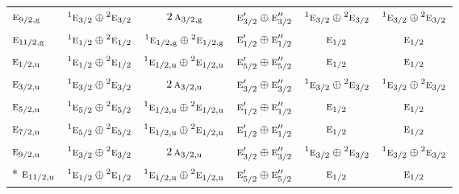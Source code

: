 \documentclass[10pt,a4paper]{article}
\numberwithin{equation}{section}
\newcommand{\irr}[1]{\text{\normalfont\scshape #1}}
\newcommand{\conjpair}[1]{{}^{#1}}
\newcommand{\ptag}[1]{\mathrm{#1}}
\begin{document}
{\begin{longtable}{@{}lccccc@{}}
$\irr{e}_{9/2,\ptag{g}}$ & $\conjpair{1}\irr{e}_{3/2}\oplus \conjpair{2}\irr{e}_{3/2}$ & $2\,\irr{a}_{3/2,\ptag{g}}$ & $\irr{e}_{3/2}'\oplus \irr{e}_{3/2}''$ & $\conjpair{1}\irr{e}_{3/2}\oplus \conjpair{2}\irr{e}_{3/2}$ & $\conjpair{1}\irr{e}_{3/2}\oplus \conjpair{2}\irr{e}_{3/2}$\\
$\irr{e}_{11/2,\ptag{g}}$ & $\conjpair{1}\irr{e}_{1/2}\oplus \conjpair{2}\irr{e}_{1/2}$ & $\conjpair{1}\irr{e}_{1/2,\ptag{g}}\oplus \conjpair{2}\irr{e}_{1/2,\ptag{g}}$ & $\irr{e}_{1/2}'\oplus \irr{e}_{1/2}''$ & $\irr{e}_{1/2}$ & $\irr{e}_{1/2}$\\
$\irr{e}_{1/2,\ptag{u}}$ & $\conjpair{1}\irr{e}_{1/2}\oplus \conjpair{2}\irr{e}_{1/2}$ & $\conjpair{1}\irr{e}_{1/2,\ptag{u}}\oplus \conjpair{2}\irr{e}_{1/2,\ptag{u}}$ & $\irr{e}_{5/2}'\oplus \irr{e}_{5/2}''$ & $\irr{e}_{1/2}$ & $\irr{e}_{1/2}$\\
$\irr{e}_{3/2,\ptag{u}}$ & $\conjpair{1}\irr{e}_{3/2}\oplus \conjpair{2}\irr{e}_{3/2}$ & $2\,\irr{a}_{3/2,\ptag{u}}$ & $\irr{e}_{3/2}'\oplus \irr{e}_{3/2}''$ & $\conjpair{1}\irr{e}_{3/2}\oplus \conjpair{2}\irr{e}_{3/2}$ & $\conjpair{1}\irr{e}_{3/2}\oplus \conjpair{2}\irr{e}_{3/2}$\\
$\irr{e}_{5/2,\ptag{u}}$ & $\conjpair{1}\irr{e}_{5/2}\oplus \conjpair{2}\irr{e}_{5/2}$ & $\conjpair{1}\irr{e}_{1/2,\ptag{u}}\oplus \conjpair{2}\irr{e}_{1/2,\ptag{u}}$ & $\irr{e}_{1/2}'\oplus \irr{e}_{1/2}''$ & $\irr{e}_{1/2}$ & $\irr{e}_{1/2}$\\
$\irr{e}_{7/2,\ptag{u}}$ & $\conjpair{1}\irr{e}_{5/2}\oplus \conjpair{2}\irr{e}_{5/2}$ & $\conjpair{1}\irr{e}_{1/2,\ptag{u}}\oplus \conjpair{2}\irr{e}_{1/2,\ptag{u}}$ & $\irr{e}_{1/2}'\oplus \irr{e}_{1/2}''$ & $\irr{e}_{1/2}$ & $\irr{e}_{1/2}$\\
$\irr{e}_{9/2,\ptag{u}}$ & $\conjpair{1}\irr{e}_{3/2}\oplus \conjpair{2}\irr{e}_{3/2}$ & $2\,\irr{a}_{3/2,\ptag{u}}$ & $\irr{e}_{3/2}'\oplus \irr{e}_{3/2}''$ & $\conjpair{1}\irr{e}_{3/2}\oplus \conjpair{2}\irr{e}_{3/2}$ & $\conjpair{1}\irr{e}_{3/2}\oplus \conjpair{2}\irr{e}_{3/2}$\\*
$\irr{e}_{11/2,\ptag{u}}$ & $\conjpair{1}\irr{e}_{1/2}\oplus \conjpair{2}\irr{e}_{1/2}$ & $\conjpair{1}\irr{e}_{1/2,\ptag{u}}\oplus \conjpair{2}\irr{e}_{1/2,\ptag{u}}$ & $\irr{e}_{5/2}'\oplus \irr{e}_{5/2}''$ & $\irr{e}_{1/2}$ & $\irr{e}_{1/2}$\\
\bottomrule\end{longtable}}
\end{document}
